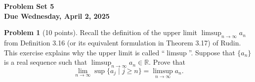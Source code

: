 \documentclass[12pt,oneside]{article}
\theoremstyle{definition}
\newtheorem{problem}{Problem}
\begin{document}
\pagestyle{fancy}


\begin{center}
\bf \Large
Problem Set 5 \\[0.5 em]
\large
Due Wednesday, April 2, 2025
\end{center}

\bigskip

\begin{problem}[10 points]
Recall the definition of the upper limit $\limsup_{n\rightarrow \infty}a_n$ from Definition 3.16 (or its equivalent formulation in Theorem 3.17) of Rudin. 
This exercise explains why the upper limit is called ``$\limsup$''.
Suppose that $\{a_n\}$ is a real sequence such that $\limsup_{n\rightarrow \infty}a_n \in \mathbb{R}$. 
Prove that
\[
\lim_{n\rightarrow \infty} \sup\{a_j\;\vert\; j\geq n\} = 
\limsup_{n\rightarrow \infty}a_n. 
\]
\end{problem}
\end{document}
